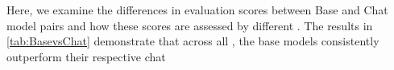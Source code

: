 
Here, we examine the differences in evaluation scores between Base and Chat model pairs and how these scores are assessed by different \judgemodels. The results in \cref{tab:BasevsChat} demonstrate that across all \judgemodels, the base models consistently outperform their respective chat \evaluatormodels
 
